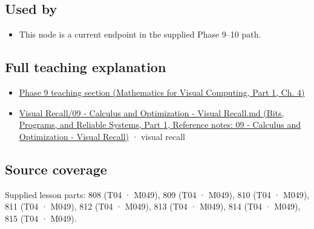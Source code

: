 \subsection{Used by}\label{appendix-d9f70bdfbc92-used-by}

\hypertarget{appendix-d9f70bdfbc92-used-by}{}

\begin{itemize}
\tightlist
\item
  This node is a current endpoint in the supplied Phase 9--10 path.
\end{itemize}

\subsection{Full teaching explanation}\label{appendix-d9f70bdfbc92-full-teaching-explanation}

\hypertarget{appendix-d9f70bdfbc92-full-teaching-explanation}{}

\begin{itemize}
\tightlist
\item
  \href{../02-Mathematics-for-Visual-Computing-P01/main.pdf\#nameddest=01-foundations-i-ch020-functions-limits-continuity-and-scalar-change}{Phase 9 teaching section (Mathematics for Visual Computing, Part 1, Ch. 4)}
\item
  \href{../01-Bits-Programs-and-Reliable-Systems-P01/main.pdf\#nameddest=appendix-adf48f5dc5c1}{Visual Recall/09 - Calculus and Optimization - Visual Recall.md (Bits, Programs, and Reliable Systems, Part 1, Reference notes: 09 - Calculus and Optimization - Visual Recall)} · visual recall
\end{itemize}

\subsection{Source coverage}\label{appendix-d9f70bdfbc92-source-coverage}

\hypertarget{appendix-d9f70bdfbc92-source-coverage}{}

Supplied lesson parts: 808 (T04 · M049), 809 (T04 · M049), 810 (T04 · M049), 811 (T04 · M049), 812 (T04 · M049), 813 (T04 · M049), 814 (T04 · M049), 815 (T04 · M049).
